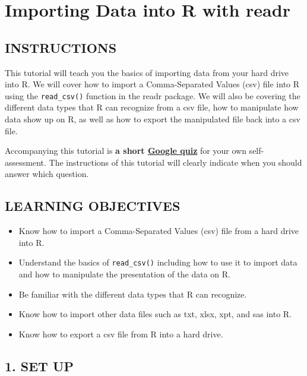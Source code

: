 \documentclass[
]{book}
\providecommand{\tightlist}{%
  \setlength{\itemsep}{0pt}\setlength{\parskip}{0pt}}
\begin{document}
\hypertarget{importing-data-into-r-with-readr}{%
\chapter{Importing Data into R with readr}\label{importing-data-into-r-with-readr}}

\hypertarget{instructions-2}{%
\section{INSTRUCTIONS}\label{instructions-2}}

This tutorial will teach you the basics of importing data from your hard drive into R. We will cover how to import a Comma-Separated Values (csv) file into R using the \texttt{read\_csv()} function in the readr package. We will also be covering the different data types that R can recognize from a csv file, how to manipulate how data show up on R, as well as how to export the manipulated file back into a csv file.

Accompanying this tutorial is \textbf{a short \href{https://forms.gle/N9yDv5tkQMiGiUB29}{Google quiz}} for your own self-assessment. The instructions of this tutorial will clearly indicate when you should answer which question.

\hypertarget{learning-objectives-2}{%
\section{LEARNING OBJECTIVES}\label{learning-objectives-2}}

\begin{itemize}
\tightlist
\item
  Know how to import a Comma-Separated Values (csv) file from a hard drive into R.
\item
  Understand the basics of \texttt{read\_csv()} including how to use it to import data and how to manipulate the presentation of the data on R.
\item
  Be familiar with the different data types that R can recognize.
\item
  Know how to import other data files such as txt, xlsx, xpt, and sas into R.
\item
  Know how to export a csv file from R into a hard drive.
\end{itemize}

\hypertarget{set-up}{%
\section{1. SET UP}\label{set-up}}
\end{document}
